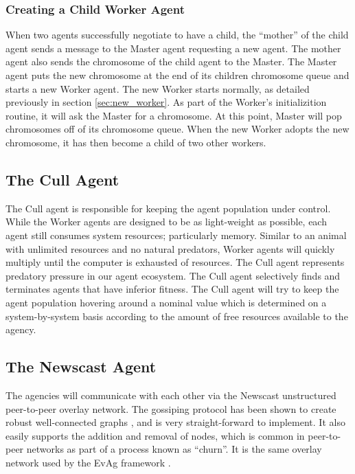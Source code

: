       \subsubsection{Creating a Child Worker Agent}
        When two agents successfully negotiate to have a child, the ``mother'' of
          the child agent sends a message to the Master agent requesting a new agent.
        The mother agent also sends the chromosome of the child agent to the Master.
        The Master agent puts the new chromosome at the end of its children chromosome
          queue and starts a new Worker agent.
        The new Worker starts normally, as detailed previously in section
          \ref{sec:new_worker}.
        As part of the Worker's initializition routine, it will ask the Master for a 
          chromosome. 
        At this point, Master will pop chromosomes off of its chromosome queue.
        When the new Worker adopts the new chromosome, it has then become a child
          of two other workers.


    \subsection{The Cull Agent} %
      The Cull agent is responsible for keeping the agent population under
        control. 
      While the Worker agents are designed to be as light-weight as possible,
        each agent still consumes system resources; particularly memory.
      Similar to an animal with unlimited resources and no natural predators,
        Worker agents will quickly multiply until the computer is exhausted of
        resources.
      The Cull agent represents predatory pressure in our agent ecosystem. 
      The Cull agent selectively finds and terminates agents that have
        inferior fitness.
      The Cull agent will try to keep the agent population hovering around 
        a nominal value which is determined on a system-by-system basis 
        according to the amount of free resources available to the agency.

    \subsection{The Newscast Agent} %
      The agencies will communicate with each other via the Newscast unstructured
        peer-to-peer overlay network. 
      The gossiping protocol has been shown to create robust well-connected
        graphs \cite{Voulgaris2005}, and is very straight-forward to implement.
      It also easily supports the addition and removal of nodes, which is
        common in peer-to-peer networks as part of a process known as ``churn''.
      It is the same overlay network used by the EvAg framework \cite{Laredo2010}. 

